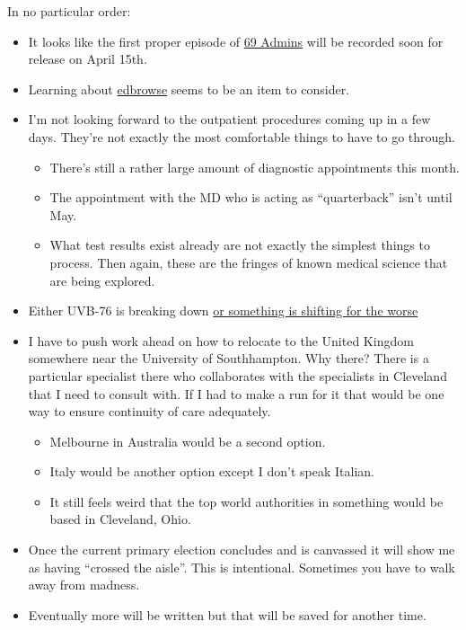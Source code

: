 In no particular order:

\begin{itemize}
\tightlist
\item
  It looks like the first proper episode of
  \href{https://69admins.com/}{69 Admins} will be recorded soon for
  release on April 15th.\\
\item
  Learning about
  \href{https://www.edbrowse.org/usersguide.html}{edbrowse} seems to be
  an item to consider.\\
\item
  I'm not looking forward to the outpatient procedures coming up in a
  few days. They're not exactly the most comfortable things to have to
  go through.

  \begin{itemize}
  \tightlist
  \item
    There's still a rather large amount of diagnostic appointments this
    month.
  \item
    The appointment with the MD who is acting as ``quarterback'' isn't
    until May.
  \item
    What test results exist already are not exactly the simplest things
    to process. Then again, these are the fringes of known medical
    science that are being explored.
  \end{itemize}
\item
  Either UVB-76 is breaking down
  \href{https://hackaday.com/2023/04/08/russias-new-mystery-shortwave-station/}{or
  something is shifting for the worse}
\item
  I have to push work ahead on how to relocate to the United Kingdom
  somewhere near the University of Southhampton. Why there? There is a
  particular specialist there who collaborates with the specialists in
  Cleveland that I need to consult with. If I had to make a run for it
  that would be one way to ensure continuity of care adequately.

  \begin{itemize}
  \tightlist
  \item
    Melbourne in Australia would be a second option.
  \item
    Italy would be another option except I don't speak Italian.
  \item
    It still feels weird that the top world authorities in something
    would be based in Cleveland, Ohio.
  \end{itemize}
\item
  Once the current primary election concludes and is canvassed it will
  show me as having ``crossed the aisle''. This is intentional.
  Sometimes you have to walk away from madness.
\item
  Eventually more will be written but that will be saved for another
  time.
\end{itemize}
